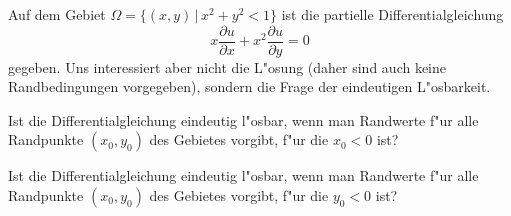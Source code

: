 Auf dem Gebiet $\Omega = \{ (x,y)\,|\, x^2+y^2 < 1\}$ ist die
partielle Differentialgleichung 
\begin{equation}
x\frac{\partial u}{\partial x}+x^2\frac{\partial u}{\partial y}=0
\label{30000008:dgl}
\end{equation}
gegeben. Uns interessiert aber nicht die L"osung (daher sind auch keine
Randbedingungen vorgegeben), sondern die Frage der eindeutigen L"osbarkeit.
\begin{teilaufgaben}
\item
Ist die Differentialgleichung eindeutig l"osbar, wenn man Randwerte f"ur
alle Randpunkte $(x_0,y_0)$ des Gebietes vorgibt, f"ur die $x_0<0$ ist?
\item
Ist die Differentialgleichung eindeutig l"osbar, wenn man Randwerte f"ur
alle Randpunkte $(x_0,y_0)$ des Gebietes vorgibt, f"ur die $y_0<0$ ist?
\end{teilaufgaben}

